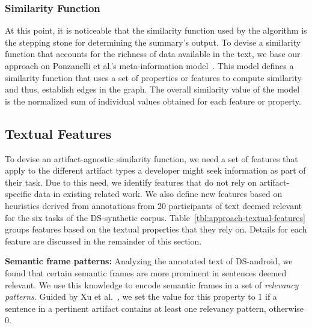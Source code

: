 \subsubsection{Similarity Function}


At this point, it is noticeable that the similarity function used by the algorithm is the stepping stone for determining the summary's output.  
To devise a similarity function that accounts for the richness of data available in the text, we base our approach on Ponzanelli et al.'s meta-information model~\cite{Ponzanelli2015}.
 This model defines a similarity function that uses a set of properties or features to compute similarity and thus, establish edges in the graph.
The overall similarity value of the model is the normalized sum of individual values obtained for each feature or property.



\subsection{Textual Features}



To devise an artifact-agnostic similarity function, we need a set of features that apply to the different artifact types a developer might seek information as part of their task.
Due to this need, we identify features that do not rely on artifact-specific data in existing related work. 
We also define new features based 
on heuristics derived from annotations from 20 participants of text deemed relevant
for the six tasks of the \acs{DS-synthetic} corpus.
Table~\ref{tbl:approach-textual-features} groups features based on the textual properties that they rely on. Details for each feature are discussed in the remainder of this section.




\vspace{3mm}
\begin{hangparas}{1em}{1}
    \textbf{Semantic frame patterns:} Analyzing the annotated text of \acs{DS-android}, 
    we found that certain semantic frames are more prominent in sentences deemed relevant.
    We use this knowledge to encode semantic frames in a set of \textit{relevancy patterns}. 
    Guided by Xu et al.~\cite{Xu2017}, we set the value for this property to 1 if a sentence in a pertinent artifact contains at least one relevancy pattern, otherwise 0.
\end{hangparas}


